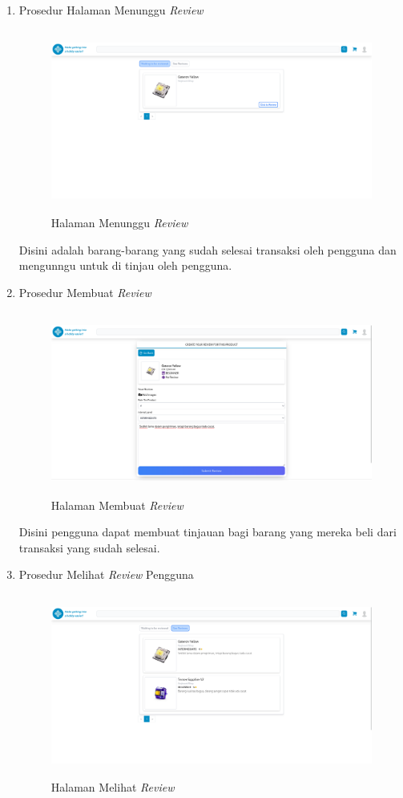 \documentclass[a4paper]{article}
\begin{document}
\begin{enumerate}
\item Prosedur Halaman Menunggu \textit{Review}

\begin{figure}[h]
    \centering
    \includegraphics*[height=6cm]{images/prosedur pengunaan aplikasi/Waiting Review.png}
    \caption{Halaman Menunggu \textit{Review}}
\end{figure}

Disini adalah barang-barang yang sudah selesai transaksi oleh pengguna dan mengunngu untuk di tinjau oleh pengguna.

\item Prosedur Membuat \textit{Review}

\begin{figure}[h]
    \centering
    \includegraphics*[height=6cm]{images/prosedur pengunaan aplikasi/Create Review.png}
    \caption{Halaman Membuat \textit{Review}}
\end{figure}

Disini pengguna dapat membuat tinjauan bagi barang yang mereka beli dari transaksi yang sudah selesai.

\item Prosedur Melihat \textit{Review} Pengguna

\begin{figure}[h]
    \centering
    \includegraphics*[height=6cm]{images/prosedur pengunaan aplikasi/See Review.png}
    \caption{Halaman Melihat \textit{Review}}
\end{figure}


\end{enumerate}
\end{document}
